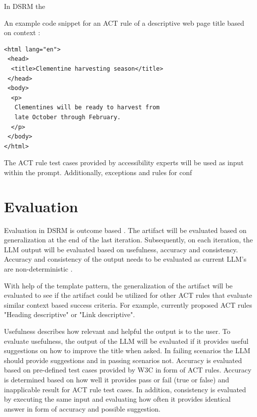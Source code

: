 In DSRM the 

An example code snippet for an ACT rule of a descriptive web page title based on context \citep{act_rule_g88}:

\begin{verbatim}
<html lang="en">
 <head>
  <title>Clementine harvesting season</title>
 </head>
 <body>
  <p>
   Clementines will be ready to harvest from 
   late October through February.
  </p>
 </body>
</html>
\end{verbatim}

The ACT rule test cases provided by accessibility experts will be used as input within the prompt. Additionally, \textcite{act_rule_g88} exceptions and rules for conf

\section{Evaluation}

Evaluation in DSRM is outcome based \citep{design_science_eval}. The artifact will be evaluated based on generalization at the end of the last iteration. Subsequently, on each iteration, the LLM output will be evaluated based on usefulness, accuracy and consistency. Accuracy and consistency of the output needs to be evaluated as current LLM's are non-deterministic \citep{ouyang2023llm, power_determinism}.

With help of the template pattern, the generalization of the artifact will be evaluated to see if the artifact could be utilized for other ACT rules that evaluate similar context based success criteria. For example, currently proposed ACT rules "Heading descriptive" or "Link descriptive".

Usefulness describes how relevant and helpful the output is to the user. To evaluate usefulness, the output of the LLM will be evaluated if it provides useful suggestions on how to improve the title when asked. In failing scenarios the LLM should provide suggestions and in passing scenarios not. Accuracy is evaluated based on pre-defined test cases provided by W3C in form of ACT rules. Accuracy is determined based on how well it provides pass or fail (true or false) and inapplicable result for ACT rule test cases. In addition, consistency is evaluated by executing the same input and evaluating how often it provides identical answer in form of accuracy and possible suggestion. 

